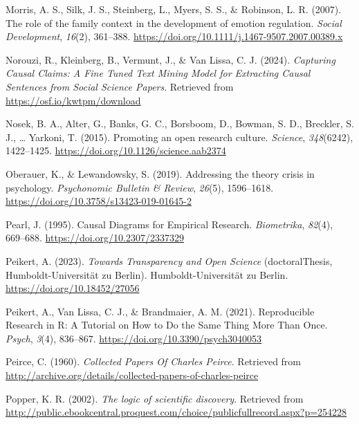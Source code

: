 \documentclass[
  man, noextraspace,floatsintext]{apa6}
\newlength{\cslhangindent}
\newenvironment{CSLReferences}[2] %
 {\begin{list}{}{%
  \setlength{\itemindent}{0pt}
  \setlength{\leftmargin}{0pt}
  \setlength{\parsep}{0pt}
  \ifodd #1
   \setlength{\leftmargin}{\cslhangindent}
   \setlength{\itemindent}{-1\cslhangindent}
  \fi
  \setlength{\itemsep}{#2\baselineskip}}}
 {\end{list}}
\begin{document}
\begin{CSLReferences}{1}{0}
Morris, A. S., Silk, J. S., Steinberg, L., Myers, S. S., \& Robinson, L. R. (2007). The role of the family context in the development of emotion regulation. \emph{Social Development}, \emph{16}(2), 361--388. \url{https://doi.org/10.1111/j.1467-9507.2007.00389.x}

Norouzi, R., Kleinberg, B., Vermunt, J., \& Van Lissa, C. J. (2024). \emph{Capturing {Causal Claims}: {A Fine Tuned Text Mining Model} for {Extracting Causal Sentences} from {Social Science Papers}}. Retrieved from \url{https://osf.io/kwtpm/download}

Nosek, B. A., Alter, G., Banks, G. C., Borsboom, D., Bowman, S. D., Breckler, S. J., \ldots{} Yarkoni, T. (2015). Promoting an open research culture. \emph{Science}, \emph{348}(6242), 1422--1425. \url{https://doi.org/10.1126/science.aab2374}

Oberauer, K., \& Lewandowsky, S. (2019). Addressing the theory crisis in psychology. \emph{Psychonomic Bulletin \& Review}, \emph{26}(5), 1596--1618. \url{https://doi.org/10.3758/s13423-019-01645-2}

Pearl, J. (1995). Causal {Diagrams} for {Empirical Research}. \emph{Biometrika}, \emph{82}(4), 669--688. \url{https://doi.org/10.2307/2337329}

Peikert, A. (2023). \emph{Towards {Transparency} and {Open Science}} (doctoralThesis, Humboldt-Universität zu Berlin). Humboldt-Universität zu Berlin. \url{https://doi.org/10.18452/27056}

Peikert, A., Van Lissa, C. J., \& Brandmaier, A. M. (2021). Reproducible {Research} in {R}: {A Tutorial} on {How} to {Do} the {Same Thing More Than Once}. \emph{Psych}, \emph{3}(4), 836--867. \url{https://doi.org/10.3390/psych3040053}

Peirce, C. (1960). \emph{Collected {Papers Of Charles Peirce}}. Retrieved from \url{http://archive.org/details/collected-papers-of-charles-peirce}

Popper, K. R. (2002). \emph{The logic of scientific discovery}. Retrieved from \url{http://public.ebookcentral.proquest.com/choice/publicfullrecord.aspx?p=254228}


\end{CSLReferences}
\end{document}

